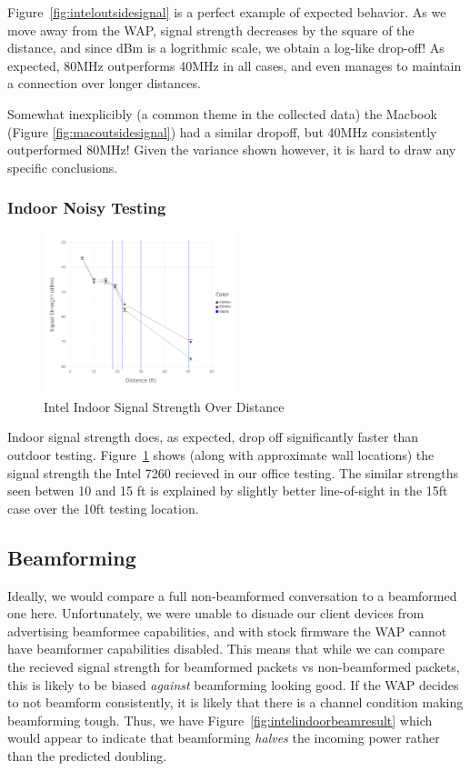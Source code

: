 Figure~\ref{fig:inteloutsidesignal} is a perfect example of expected
behavior. As we move away from the WAP, signal strength decreases by
the square of the distance, and since dBm is a logrithmic scale, we
obtain a log-like drop-off! As expected, 80MHz outperforms 40MHz in
all cases, and even manages to maintain a connection over longer
distances.

Somewhat inexplicibly (a common theme in the collected data) the
Macbook (Figure \ref{fig:macoutsidesignal}) had a similar dropoff, but
40MHz consistently outperformed 80MHz! Given the variance shown
however, it is hard to draw any specific conclusions. 

\subsubsection{Indoor Noisy Testing}


\begin{figure}[!h]
\centering
\includegraphics[width=0.5\textwidth]{figures/Intel_Inside_Beamformed}
\caption{Intel Indoor Signal Strength Over Distance}
\label{fig:intelinsidesignal}
\end{figure}

Indoor signal strength does, as expected, drop off significantly
faster than outdoor testing. Figure~\ref{fig:intelinsidesignal} shows
(along with approximate wall locations) the signal strength the Intel
7260 recieved in our office testing. The similar strengths seen betwen
10 and 15 ft is explained by slightly better line-of-sight in the 15ft
case over the 10ft testing location. 

\subsection{Beamforming}
Ideally, we would compare a full non-beamformed conversation to a
beamformed one here. Unfortunately, we were unable to disuade our
client devices from advertising beamformee capabilities, and with
stock firmware the WAP cannot have beamformer capabilities disabled.
This means that while we can compare the recieved signal strength for
beamformed packets vs non-beamformed packets, this is likely to be
biased \emph{against} beamforming looking good. If the WAP decides to
not beamform consistently, it is likely that there is a channel
condition making beamforming tough.   Thus, we have Figure~\ref{fig:intelindoorbeamresult}
which would appear to indicate that beamforming \emph{halves} the
incoming power rather than the predicted doubling.

